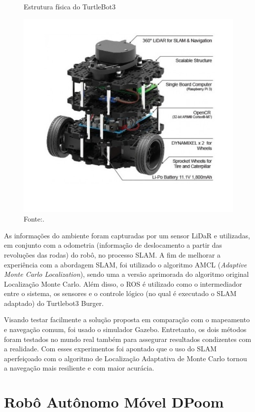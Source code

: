 \begin{figure}[H]
    \centering
    \caption{Estrutura física do TurtleBot3}
    \includegraphics[scale=0.35]{turtlebot3.jpeg}
    \caption*{Fonte:\citet{turtleBot3Burger:2021}.}
    \label{fig:turtlebotSLAM}
\end{figure}

As informações do ambiente foram capturadas por um sensor LiDaR e utilizadas, em conjunto com a odometria  (informação de deslocamento a partir das revoluções das rodas) do robô, no processo SLAM. A fim de melhorar a experiência com a abordagem SLAM, foi utilizado o algoritmo AMCL (\textit{Adaptive Monte Carlo Localization}), sendo uma a versão aprimorada do algoritmo original Localização Monte Carlo. Além disso, o ROS é utilizado como o intermediador entre o sistema, os sensores e o controle lógico (no qual é executado o SLAM adaptado) do Turtlebot3 Burger. 

Visando testar facilmente a solução proposta em comparação com o mapeamento e navegação comum, foi usado o simulador Gazebo. Entretanto, os dois métodos foram testados no mundo real também para assegurar resultados condizentes com a realidade. Com esses experimentos foi apontado que o uso do SLAM aperfeiçoado com o algoritmo de Localização Adaptativa de Monte Carlo tornou a navegação mais resiliente e com maior acurácia.


\section{Robô Autônomo Móvel DPoom}

